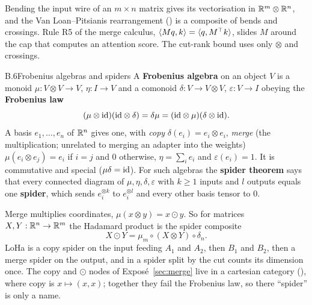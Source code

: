 Bending the input wire of an $m\times n$ matrix gives its vectorisation in $\mathbb{R}^m\otimes\mathbb{R}^n$, and the Van
Loan--Pitsianis rearrangement () is a composite of bends and crossings. Rule R5 of the merge calculus,
$\langle Mq,k\rangle=\langle q,M^{\top} k\rangle$, slides $M$ around the cap that computes an attention score. The cut-rank
bound uses only $\otimes$ and crossings.


\begin{bgentry}{B.6}{Frobenius algebras and spiders}
A \textbf{Frobenius algebra} on an object $V$ is a monoid $\mu:V\otimes V\to V$, $\eta:I\to V$ and a comonoid
$\delta:V\to V\otimes V$, $\varepsilon:V\to I$ obeying the \textbf{Frobenius law}
\begin{equation*}
  (\mu\otimes\mathrm{id})(\mathrm{id}\otimes\delta)=\delta\mu=(\mathrm{id}\otimes\mu)(\delta\otimes\mathrm{id}).
\end{equation*}
A basis $e_1,\dots,e_n$ of $\mathbb{R}^n$ gives one, with \emph{copy} $\delta(e_i)=e_i\otimes e_i$, \emph{merge} (the
multiplication; unrelated to merging an adapter into the weights) $\mu(e_i\otimes e_j)=e_i$ if $i=j$ and $0$ otherwise,
$\eta=\sum_ie_i$ and $\varepsilon(e_i)=1$. It is commutative and special ($\mu\delta=\mathrm{id}$). For such algebras the
\textbf{spider theorem} says that every connected diagram of $\mu,\eta,\delta,\varepsilon$ with $k\ge1$ inputs and $l$
outputs equals one \textbf{spider}, which sends $e_i^{\otimes k}$ to $e_i^{\otimes l}$ and every other basis tensor to
$0$.
\end{bgentry}

Merge multiplies coordinates, $\mu(x\otimes y)=x\odot y$. So for matrices $X,Y:\mathbb{R}^n\to\mathbb{R}^m$ the Hadamard product is the
spider composite
\begin{equation*}
  X\odot Y=\mu_m\circ(X\otimes Y)\circ\delta_n.
\end{equation*}
LoHa \citep{hyeonwoo2021fedpara} is a copy spider on the input feeding $A_1$ and $A_2$, then $B_1$ and $B_2$, then a merge
spider on the output, and in  a spider split by the cut counts its dimension once. The copy and
$\odot$ nodes of Exposé~\ref{sec:merge} live in a cartesian category (), where copy is $x\mapsto(x,x)$;
together they fail the Frobenius law, so there ``spider'' is only a name.


